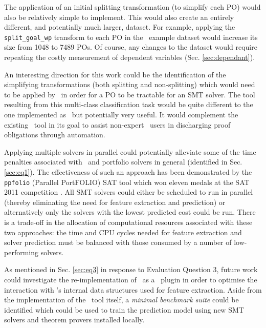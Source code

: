 The application of an initial splitting transformation (to simplify each PO) would also be relatively simple to implement.
This would also create an entirely different, and potentially much larger, dataset. 
For example, applying the \texttt{split\_goal\_wp} transform to each PO in the \why~example dataset would increase its size from 1048 to 7489 POs.
Of course, any changes to the dataset would require repeating the costly measurement of dependent variables (Sec. \ref{sec:dependant}).

An interesting direction for this work could be the identification of the simplifying transformations (both splitting and non-splitting) which would need to be applied by \why~in order for a PO to be tractable for an SMT solver.
The tool resulting from this multi-class classification task would be quite different to the one implemented as \where~but potentially very useful.
It would complement the existing \where~tool in its goal to assist non-expert \why~users in discharging proof obligations through automation.

Applying multiple solvers in parallel could potentially alleviate some of the time penalties associated with \where~and portfolio solvers in general (identified in Sec. \ref{sec:eq1}).
The effectiveness of such an approach has been demonstrated by the \texttt{ppfolio} (Parallel PortFOLIO) SAT tool which won eleven medals at the SAT 2011 competition \cite{Malitsky2012}.
All SMT solvers could either be scheduled to run in parallel (thereby eliminating the need for feature extraction and prediction) or alternatively only the solvers with the lowest predicted cost could be run.
There is a trade-off in the allocation of computational resources associated with these two approaches: the time and CPU cycles needed for feature extraction and solver prediction must be balanced with those consumed by a number of low-performing solvers.     
 
As mentioned in Sec. \ref{sec:eq3} in response to Evaluation Question 3, future work could investigate the re-implementation of \where~as a \why~plugin in order to optimise the interaction with \why's internal data structures used for feature extraction.
Aside from the implementation of the \where~tool itself, a
\textit{minimal benchmark suite} could be identified which could be used to train the prediction model using new SMT solvers and theorem provers installed locally.
